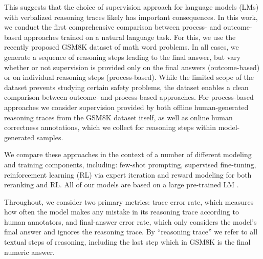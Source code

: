 \documentclass[11pt, a4paper, logo]{deepmind}
\begin{document}
This suggests that the choice of supervision approach for language models (LMs) with verbalized reasoning traces likely has important consequences.
In this work, we conduct the first comprehensive comparison between process- and outcome-based approaches trained on a natural language task.
For this, we use the recently proposed GSM8K dataset \citep{cobbe2021training} of math word problems. In all cases, we generate a sequence of reasoning steps leading to the final answer, but vary whether or not supervision is provided only on the final answers (outcome-based) or on individual reasoning steps (process-based). 
While the limited scope of the dataset prevents studying certain safety problems, the dataset enables a clean comparison between outcome- and process-based approaches. For process-based approaches we consider supervision provided by both offline human-generated reasoning traces from the GSM8K dataset itself, as well as online human correctness annotations, which we collect for reasoning steps within model-generated samples. 

We compare these approaches in the context of a number of different modeling and training components, including:  few-shot prompting, supervised fine-tuning, reinforcement learning (RL) via expert iteration and reward modeling for both reranking and RL.  All of our models are based on a large pre-trained LM \citep{hoffman2022chinchilla}.

Throughout, we consider two primary metrics: trace error rate, which measures how often the model makes any mistake in its reasoning trace according to human annotators, and final-answer error rate, which only considers the model's final answer and ignores the reasoning trace.
By ``reasoning trace'' we refer to all textual steps of reasoning, including the last step which in GSM8K is the final numeric answer.
\end{document}

